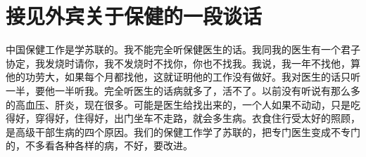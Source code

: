 \section[接见外宾关于保健的一段谈话（一九六四年六月二十四日）]{接见外宾关于保健的一段谈话}


中国保健工作是学苏联的。我不能完全听保健医生的话。我同我的医生有一个君子协定，我发烧时请你，我不发烧时不找你，你也不找我。我说，我一年不找他，算他的功劳大，如果每个月都找他，这就证明他的工作没有做好。我对医生的话只听一半，要他一半听我。完全听医生的话病就多了，活不了。以前没有听说有那么多的高血压、肝炎，现在很多。可能是医生给找出来的，一个人如果不动动，只是吃得好，穿得好，住得好，出门坐车不走路，就会多生病。衣食住行受太好的照顾，是高级干部生病的四个原因。我们的保健工作学了苏联的，把专门医生变成不专门的，不多看各种各样的病，不好，要改进。


